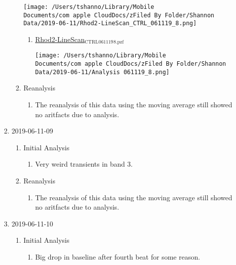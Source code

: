 \documentclass[11pt]{article}
\begin{document}
\begin{enumerate}
\begin{enumerate}
\begin{enumerate}
\begin{center}
\texttt{[image: /Users/tshanno/Library/Mobile Documents/com~apple~CloudDocs/zFiled By Folder/Shannon Data/2019-06-11/Rhod2-LineScan\_CTRL\_061119\_8.png]}
\end{center}
\begin{enumerate}
\item \href{file:///Users/tshanno/Library/Mobile Documents/com\~apple\~CloudDocs/zFiled By Folder/Shannon Data/2019-06-11/Rhod2-LineScan\_CTRL\_061119\_8.pzf}{Rhod2-LineScan\(_{\text{CTRL}}\)\(_{\text{061119}}\)\(_{\text{8.pzf}}\)}
\label{sec:org1cb7128}
\begin{center}
\texttt{[image: /Users/tshanno/Library/Mobile Documents/com~apple~CloudDocs/zFiled By Folder/Shannon Data/2019-06-11/Analysis 061119\_8.png]}
\end{center}
\end{enumerate}
\item Reanalysis
\label{sec:orgc5abaa2}
\begin{enumerate}
\item The reanalysis of this data using the moving average still showed no aritfacts due to analysis.
\label{sec:orgd1452d6}
\end{enumerate}
\end{enumerate}
\item 2019-06-11-09
\label{sec:org4de47eb}
\begin{enumerate}
\item Initial Analysis
\label{sec:orge1cfe7c}
\begin{enumerate}
\item Very weird transients in band 3.
\label{sec:orgceedc95}
\end{enumerate}
\item Reanalysis
\label{sec:org9a2d21d}
\begin{enumerate}
\item The reanalysis of this data using the moving average still showed no aritfacts due to analysis.
\label{sec:org2a86747}
\end{enumerate}
\end{enumerate}
\item 2019-06-11-10
\label{sec:orgc78bb57}
\begin{enumerate}
\item Initial Analysis
\label{sec:orgfb7cd84}
\begin{enumerate}
\item Big drop in baseline after fourth beat for some reason.

\end{enumerate}
\end{enumerate}
\end{enumerate}
\end{enumerate}
\end{document}
